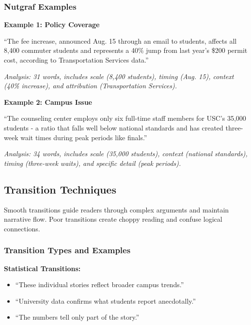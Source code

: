 \documentclass[12pt]{article}
\begin{document}
\subsubsection{Nutgraf Examples}

\begin{examplebox}
\textbf{Example 1: Policy Coverage}

``The fee increase, announced Aug. 15 through an email to students, affects all 8,400 commuter students and represents a 40\% jump from last year's \$200 permit cost, according to Transportation Services data.''

\textit{Analysis: 31 words, includes scale (8,400 students), timing (Aug. 15), context (40\% increase), and attribution (Transportation Services).}
\end{examplebox}

\begin{examplebox}
\textbf{Example 2: Campus Issue}

``The counseling center employs only six full-time staff members for USC's 35,000 students - a ratio that falls well below national standards and has created three-week wait times during peak periods like finals.''

\textit{Analysis: 34 words, includes scale (35,000 students), context (national standards), timing (three-week waits), and specific detail (peak periods).}
\end{examplebox}

\newpage
\subsection{Transition Techniques}
\label{sec:transition-flow}

Smooth transitions guide readers through complex arguments and maintain narrative flow. Poor transitions create choppy reading and confuse logical connections.

\subsubsection{Transition Types and Examples}

\begin{examplebox}
\textbf{Statistical Transitions:}
\begin{itemize}
    \item ``These individual stories reflect broader campus trends.''
    \item ``University data confirms what students report anecdotally.''
    \item ``The numbers tell only part of the story.''
\end{itemize}
\end{examplebox}
\end{document}

